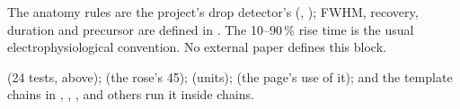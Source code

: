 The anatomy rules are the project's drop detector's (, );
FWHM, recovery, duration and precursor are defined in
. The 10--90\,\% rise time is the usual
electrophysiological convention. No external paper defines this block.

 (24 tests, above); 
(the rose's 45\textdegree{});  (units);
 (the page's use of it); and the template
chains in , ,
,  and others run it
inside chains.
